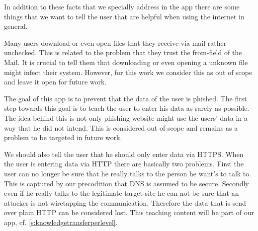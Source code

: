 In addition to these facts that we specially address in the app there are some things that we want to tell the user that are helpful when using the internet in general.
\begin{description}[leftmargin=0cm]
	\item[Do Not Download Attachment] Many users download or even open files that they receive via mail rather unchecked.
	This is related to the problem that they trust the from-field of the Mail.
	It is crucial to tell them that downloading or even opening a unknown file might infect their system.
	However, for this work we consider this as out of scope and leave it open for future work.
	\item[Data Economy] The goal of this app is to prevent that the data of the user is phished.
	The first step towards this goal is to teach the user to enter his data as rarely as possible.
	The idea behind this is not only phishing website might use the users' data in a way that he did not intend. 
	This is considered out of scope and remains as a problem to be targeted in future work.
	\item[Date Entry Via Https] We should also tell the user that he should only enter data via HTTPS. 
	When the user is entering data via HTTP there are basically two problems.
	First the user can no longer be sure that he really talks to the person he want's to talk to.
	This is captured by our precodition that DNS is assumed to be secure.
	Secondly even if he really talks to the legitimate target site he can not be sure that an attacker is not wiretapping the communication.
	Therefore the data that is send over plain HTTP can be considered lost.
	This teaching content will be part of our app, cf. \autoref{s:knowledgetransferperlevel}.	
\end{description}

